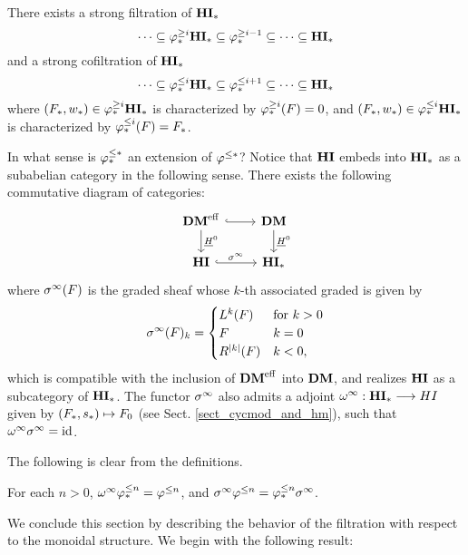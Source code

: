 \begin{cor}
There exists a strong filtration of $\mathbf{HI}_*$
\[
\cdots \subseteq \varphi^{\geq i}_{*}\mathbf{HI}_* \subseteq \varphi^{\geq i - 1}_{*} \subseteq 
   \cdots \subseteq \mathbf{HI}_*
\]
and a strong cofiltration of $\mathbf{HI}_*$
\[
\cdots \subseteq \varphi^{\leq i}_{*}\mathbf{HI}_* \subseteq \varphi^{\leq i + 1}_{*} \subseteq 
   \cdots \subseteq \mathbf{HI}_*
\]
where $(F_*, w_*) \in \varphi^{\geq i}_{*}\mathbf{HI}_*$ is characterized by
$\varphi^{\geq i}_{*}(F) = 0$, and $(F_*, w_*) \in \varphi^{\leq i}_{*}\mathbf{HI}_*$ is
characterized by $\varphi^{\leq i}_{*}(F) = F_*$.
\end{cor}
\noproof

In what sense is $\varphi^{\leq *}_{*}$ an extension of $\varphi^{\leq *}$? Notice that
$\mathbf{HI}$ embeds into $\mathbf{HI}_*$ as a subabelian category in the following 
sense. There exists the following commutative diagram of categories:
\[
\begin{tikzcd}
\DMeff \arrow[hookrightarrow]{r} \arrow{d}{\sheaf{H}^0} &
\DM \arrow{d}{\sheaf{H}^0} \\
\HI \arrow[hookrightarrow]{r}{\spectHI} &
\HM
\end{tikzcd}
\]
where $\sigma^\infty(F)$ is the graded sheaf whose $k$-th associated
graded is given by
\[
\sigma^\infty(F)_k = \begin{cases}
L^k(F)   & \textrm{for }k > 0 \\
F            & k = 0 \\
R^{|k|}(F) & k < 0,
\end{cases}
\]
which is compatible with the inclusion of $\mathbf{DM}^{\mathrm{eff}}$ into $\mathbf{DM}$,
and realizes $\mathbf{HI}$ as a subcategory of $\mathbf{HI}_*$. The functor 
$\sigma^\infty$ also admits a adjoint $\omega^\infty : \mathbf{HI}_* \longrightarrow HI$ given by 
$(F_*, s_*) \mapsto F_0$ (see Sect. \ref{sect_cycmod_and_hm}), 
such that $\omega^\infty \sigma^\infty = \mathrm{id}$.

The following is clear from the definitions.

\begin{prop}
For each $n > 0$, $\omega^\infty \varphi^{\leq n}_{*} = \varphi^{\leq n}$, and $\sigma^\infty 
\varphi^{\leq n} = \varphi^{\leq n}_{*} \sigma^\infty$.
\end{prop}

We conclude this section by describing the behavior of the 
filtration with respect to the monoidal structure. We begin
with the following result:

